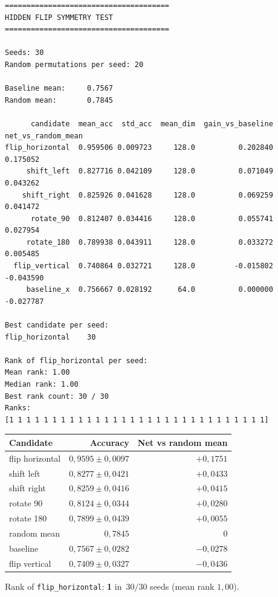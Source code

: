 \documentclass[11pt,a4paper]{report}
\begin{document}
\begin{verbatim}
======================================
HIDDEN FLIP SYMMETRY TEST
======================================

Seeds: 30
Random permutations per seed: 20

Baseline mean:     0.7567
Random mean:       0.7845

      candidate  mean_acc  std_acc  mean_dim  gain_vs_baseline  net_vs_random_mean
flip_horizontal  0.959506 0.009723     128.0          0.202840            0.175052
     shift_left  0.827716 0.042109     128.0          0.071049            0.043262
    shift_right  0.825926 0.041628     128.0          0.069259            0.041472
      rotate_90  0.812407 0.034416     128.0          0.055741            0.027954
     rotate_180  0.789938 0.043911     128.0          0.033272            0.005485
  flip_vertical  0.740864 0.032721     128.0         -0.015802           -0.043590
     baseline_x  0.756667 0.028192      64.0          0.000000           -0.027787

Best candidate per seed:
flip_horizontal    30

Rank of flip_horizontal per seed:
Mean rank: 1.00
Median rank: 1.00
Best rank count: 30 / 30
Ranks:
[1 1 1 1 1 1 1 1 1 1 1 1 1 1 1 1 1 1 1 1 1 1 1 1 1 1 1 1 1 1]
\end{verbatim}

\begin{center}
\begin{tabular}{lrr}
\toprule
Candidate & Accuracy & Net vs random mean \\
\midrule
flip horizontal & $0{,}9595\pm0{,}0097$ & $+0{,}1751$ \\
shift left & $0{,}8277\pm0{,}0421$ & $+0{,}0433$ \\
shift right & $0{,}8259\pm0{,}0416$ & $+0{,}0415$ \\
rotate 90 & $0{,}8124\pm0{,}0344$ & $+0{,}0280$ \\
rotate 180 & $0{,}7899\pm0{,}0439$ & $+0{,}0055$ \\
random mean & $0{,}7845$ & $0$ \\
baseline & $0{,}7567\pm0{,}0282$ & $-0{,}0278$ \\
flip vertical & $0{,}7409\pm0{,}0327$ & $-0{,}0436$ \\
\bottomrule
\end{tabular}
\end{center}

Rank of \texttt{flip\_horizontal}: \textbf{1} in~$30/30$ seeds (mean rank $1{,}00$).
\end{document}
